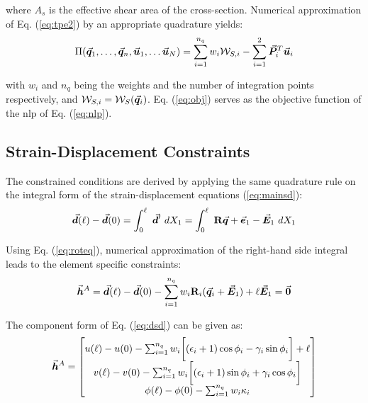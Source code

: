\noindent where $A_s$ is the effective shear area of the cross-section. 
Numerical
approximation of Eq. (\ref{eq:tpe2}) by an appropriate quadrature yields:
\begin{gather}
 	\Pi(\vec{\bm{q}}_1,\ldots,\vec{\bm{q}}_n,\vec{\bm{u}}_1,\ldots\vec{\bm{u}}_N) = 
 	\sum_{i=1}^{n_q}
	w_i\mathcal{W}_{S,i} - \sum_{i=1}^2\vec{\bm{P}}^T_i\vec{\bm{u}}_i
	\label{eq:obj}
\end{gather}

\noindent with $w_i$ and $n_q$ being the weights and the number of 
integration
points respectively, and $\mathcal{W}_{S,i} = \mathcal{W}_S(\vec{\bm{q}}_i)$.
Eq. (\ref{eq:obj}) serves as the objective function of the \acrshort{nlp} of
Eq. (\ref{eq:nlp}).

\subsection{Strain-Displacement Constraints}\label{subsection:CH2-S3SS3}

The constrained conditions are derived by applying the same quadrature rule on
the integral form of the strain-displacement equations (\ref{eq:mainsd}):
\begin{gather}
	\bvec{d}(\ell)-\bvec{d}(0) = \int_0^\ell\ \bvec{d}'\ dX_1=\int_0^\ell\
	\bmat{R}\bvec{q}+\bvec{e}_1-\bvec{E}_1\ dX_1
	\label{eq:cintform}
\end{gather}

\noindent Using Eq. (\ref{eq:roteq}), numerical approximation of the right-hand
side integral leads to the element specific constraints:
\begin{gather}
	\vec{\bm{h}}^A = \vec{\bm{d}}(\ell)-\vec{\bm{d}}(0) - \sum_{i=1}^{n_q}
	w_i\mathbf{R}_i(\vec{\bm{q}}_i+\vec{\bm{E}}_1)+\ell\vec{\bm{E}}_1=\vec{\bm{0}}
	\label{eq:dsd}
\end{gather}


\noindent The component form of Eq. (\ref{eq:dsd}) can be given as:
\begin{gather}
	\vec{\bm{h}}^A = \begin{bmatrix}
		u(\ell)-u(0) - \sum_{i=1}^{n_q} 
		w_i\bigg[(\epsilon_i+1)\cos\phi_i -
		\gamma_i\sin\phi_i\bigg] +\ell\\
		v(\ell)-v(0) - \sum_{i=1}^{n_q} 
		w_i\bigg[(\epsilon_i+1)\sin\phi_i +
		\gamma_i\cos\phi_i\bigg]\\
		\phi(\ell)-\phi(0) - \sum_{i=1}^{n_q} w_i\kappa_i
	\end{bmatrix}
\end{gather}

